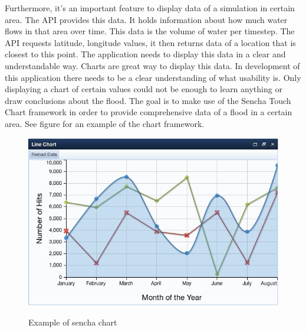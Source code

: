 Furthermore, it's an important feature to display data of a simulation in certain area. The API provides this data. It holds information about how much water flows in that area over time. This data is the volume of water per timestep. The API requests latitude, longitude values, it then returns data of a location that is closest to this point. The application needs to display this data in a clear and understandable way. Charts are great way to display this data. In development of this application there needs to be a clear understanding of what usability is. Only displaying a chart of certain values could not be enough to learn anything or draw conclusions about the flood. The goal is to make use of the Sencha Touch Chart framework in order to provide comprehensive data of a flood in a certain area. See figure \label{fig:sencha chart} for an example of the chart framework.

\begin{figure}[H]
\center
	\includegraphics[scale=0.5]{chart.png} \\
\caption{Example of sencha chart}
\label{fig:sencha chart}
\end{figure}

